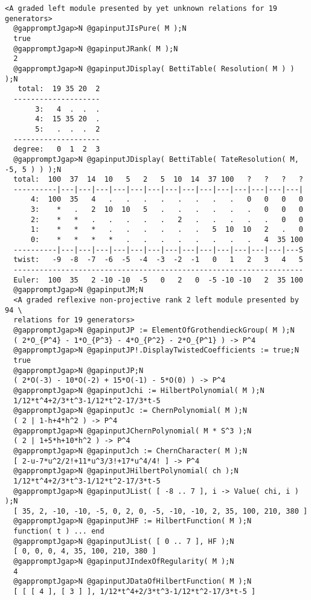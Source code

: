 \documentclass[a4paper,11pt]{report}
\begin{document}
{{{\begin{Verbatim}[commandchars=@JN,fontsize=\small,frame=single,label=Example]
  <A graded left module presented by yet unknown relations for 19 generators>
  @gappromptJgap>N @gapinputJIsPure( M );N
  true
  @gappromptJgap>N @gapinputJRank( M );N
  2 
  @gappromptJgap>N @gapinputJDisplay( BettiTable( Resolution( M ) ) );N
   total:  19 35 20  2
  --------------------
       3:   4  .  .  .
       4:  15 35 20  .
       5:   .  .  .  2
  --------------------
  degree:   0  1  2  3
  @gappromptJgap>N @gapinputJDisplay( BettiTable( TateResolution( M, -5, 5 ) ) );N
  total:  100  37  14  10   5   2   5  10  14  37 100   ?   ?   ?   ?
  ----------|---|---|---|---|---|---|---|---|---|---|---|---|---|---|
      4:  100  35   4   .   .   .   .   .   .   .   .   0   0   0   0
      3:    *   .   2  10  10   5   .   .   .   .   .   .   0   0   0
      2:    *   *   .   .   .   .   .   2   .   .   .   .   .   0   0
      1:    *   *   *   .   .   .   .   .   .   5  10  10   2   .   0
      0:    *   *   *   *   .   .   .   .   .   .   .   .   4  35 100
  ----------|---|---|---|---|---|---|---|---|---|---|---|---|---|---S
  twist:   -9  -8  -7  -6  -5  -4  -3  -2  -1   0   1   2   3   4   5
  -------------------------------------------------------------------
  Euler:  100  35   2 -10 -10  -5   0   2   0  -5 -10 -10   2  35 100
  @gappromptJgap>N @gapinputJM;N
  <A graded reflexive non-projective rank 2 left module presented by 94 \
  relations for 19 generators>
  @gappromptJgap>N @gapinputJP := ElementOfGrothendieckGroup( M );N
  ( 2*O_{P^4} - 1*O_{P^3} - 4*O_{P^2} - 2*O_{P^1} ) -> P^4
  @gappromptJgap>N @gapinputJP!.DisplayTwistedCoefficients := true;N
  true
  @gappromptJgap>N @gapinputJP;N
  ( 2*O(-3) - 10*O(-2) + 15*O(-1) - 5*O(0) ) -> P^4
  @gappromptJgap>N @gapinputJchi := HilbertPolynomial( M );N
  1/12*t^4+2/3*t^3-1/12*t^2-17/3*t-5
  @gappromptJgap>N @gapinputJc := ChernPolynomial( M );N
  ( 2 | 1-h+4*h^2 ) -> P^4
  @gappromptJgap>N @gapinputJChernPolynomial( M * S^3 );N
  ( 2 | 1+5*h+10*h^2 ) -> P^4
  @gappromptJgap>N @gapinputJch := ChernCharacter( M );N
  [ 2-u-7*u^2/2!+11*u^3/3!+17*u^4/4! ] -> P^4
  @gappromptJgap>N @gapinputJHilbertPolynomial( ch );N
  1/12*t^4+2/3*t^3-1/12*t^2-17/3*t-5
  @gappromptJgap>N @gapinputJList( [ -8 .. 7 ], i -> Value( chi, i ) );N
  [ 35, 2, -10, -10, -5, 0, 2, 0, -5, -10, -10, 2, 35, 100, 210, 380 ]
  @gappromptJgap>N @gapinputJHF := HilbertFunction( M );N
  function( t ) ... end
  @gappromptJgap>N @gapinputJList( [ 0 .. 7 ], HF );N
  [ 0, 0, 0, 4, 35, 100, 210, 380 ]
  @gappromptJgap>N @gapinputJIndexOfRegularity( M );N
  4
  @gappromptJgap>N @gapinputJDataOfHilbertFunction( M );N
  [ [ [ 4 ], [ 3 ] ], 1/12*t^4+2/3*t^3-1/12*t^2-17/3*t-5 ]
\end{Verbatim}
 }

 }

  }
\end{document}
